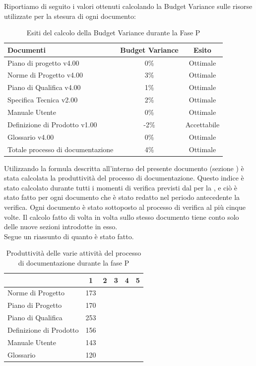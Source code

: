 Riportiamo di seguito i valori ottenuti calcolando la Budget Variance sulle risorse utilizzate per la stesura di ogni documento:
			\begin{table}[H]
					\centering
					\begin{tabu}{| l | c | c |}
							\hline
							Documenti 							& Budget Variance	& Esito		\\ \hline \hline
							
							Piano di progetto v4.00				& 0\% 		& Ottimale  \\ \hline
							Norme di Progetto v4.00 			& 3\%		& Ottimale  \\ \hline
							Piano di Qualifica v4.00 			& 1\%		& Ottimale  \\ \hline
							Specifica Tecnica v2.00 			& 2\%		& Ottimale  \\ \hline
							Manuale Utente  			& 0\%		& Ottimale  \\ \hline
							Definizione di Prodotto v1.00 			& -2\%		& Accettabile  \\ \hline
							Glossario v4.00					 	& 0\% 		& Ottimale  \\ \hline
							Totale processo di documentazione & 4\% & Ottimale \\ \hline
						\end{tabu}
					\caption{Esiti del calcolo della Budget Variance durante la Fase P}
				\end{table}
Utilizzando la formula descritta all'interno del presente documento (sezione ) è stata calcolata la produttività del processo di documentazione. Questo indice è stato calcolato durante tutti i momenti di verifica previsti dal  per la , e ciò è stato fatto per ogni documento che è stato redatto nel periodo antecedente la verifica. Ogni documento è stato sottoposto al processo di verifica al più cinque volte. Il calcolo fatto di volta in volta sullo stesso documento tiene conto solo delle nuove sezioni introdotte in esso.\\
Segue un riassunto di quanto è stato fatto.
\begin{table}[H]
      \centering
		\begin{tabu}{| l | c | c | c | c | c |}
		\hline
		&1	&2	&3	&4	&5	\\ \hline
		Norme di Progetto	& 173 &	&	&	& \\ \hline
		Piano di Progetto	& 170 &	&	&	& \\ \hline
		Piano di Qualifica	& 253	&	&	&	&\\ \hline
		Definizione di Prodotto & 156 &	 	&	&  	&\\ \hline
		Manuale Utente & 143	&	&	&	& \\ \hline
		Glossario & 120 &  & & &\\ \hline
		\end{tabu}
		\caption{Produttività delle varie attività del processo di documentazione durante la fase P}
\end{table}
